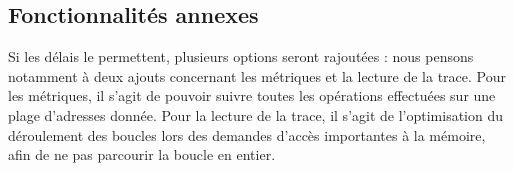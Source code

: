 \subsection{Fonctionnalités annexes}

Si les délais le permettent, plusieurs options seront rajoutées : nous pensons notamment à deux ajouts concernant les métriques et la lecture de la trace. Pour les métriques, il s'agit de pouvoir suivre toutes les opérations effectuées sur une plage d'adresses donnée. Pour la lecture de la trace, il s'agit de l'optimisation du déroulement des boucles lors des demandes d'accès importantes à la mémoire, afin de ne pas parcourir la boucle en entier.
